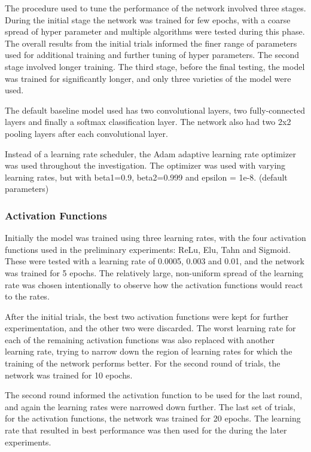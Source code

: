 \documentclass[]{article}
\begin{document}
The procedure used to tune the performance of the network involved three stages. During the initial stage the network was trained for few epochs, with a coarse spread of hyper parameter and multiple algorithms were tested during this phase. The overall results from the initial trials informed the finer range of parameters used for additional training and further tuning of hyper parameters. The second stage involved longer training. The third stage, before the final testing, the model was trained for significantly longer, and only three varieties of the model were used. 


The default baseline model used has two convolutional layers, two fully-connected layers and finally a softmax classification layer. The network also had two 2x2 pooling layers after each convolutional layer. 

Instead of a learning rate scheduler, the Adam adaptive learning rate optimizer was used throughout the investigation. The optimizer was used with varying learning rates, but with beta1=0.9, beta2=0.999 and epsilon = 1e-8. (default parameters) 


\subsubsection{Activation Functions}

Initially the model was trained using three learning rates, with the four activation functions used in the preliminary experiments: ReLu, Elu, Tahn and Sigmoid. These were tested with a learning rate of 0.0005, 0.003 and 0.01, and the network was trained for 5 epochs. The relatively large, non-uniform spread of the learning rate was chosen intentionally to observe how the activation functions would react to the rates.

After the initial trials, the best two activation functions were kept for further experimentation, and the other two were discarded. The worst learning rate for each of the remaining activation functions was also replaced with another learning rate, trying to narrow down the region of learning rates for which the training of the network performs better. For the second round of trials, the network was trained for 10 epochs. 

The second round informed the activation function to be used for the last round, and again the learning rates were narrowed down further. The last set of trials, for the activation functions, the network was trained for 20 epochs. The learning rate that resulted in best performance was then used for the during the later experiments. 
\end{document}
